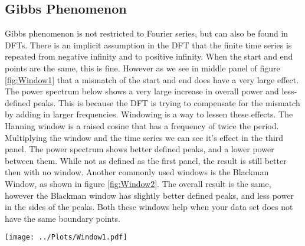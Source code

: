 \documentclass[twocolumn]{myarticle}
\begin{document}

\subsection{Gibbs Phenomenon}
\label{sec:gibbs_phenomenon}

Gibbs phenomenon is not restricted to Fourier series, but can also be found in DFTs. 
There is an implicit assumption in the DFT that the finite time series is repeated from negative infinity and to positive infinity. 
When the start and end points are the same, this is fine. 
However as we see in middle panel of figure \ref{fig:Window1} that a mismatch of the start and end does have a very large effect. 
The power spectrum below shows a very large increase in overall power and less-defined peaks. 
This is because the DFT is trying to compensate for the mismatch by adding in larger frequencies. 
Windowing is a way to lessen these effects. 
The Hanning window is a raised cosine that has a frequency of twice the period. 
Multiplying the window and the time series we can see it's effect in the third panel. 
The power spectrum shows better defined peaks, and a lower power between them. 
While not as defined as the first panel, the result is still better then with no window. 
Another commonly used windows is the Blackman Window, as shown in figure \ref{fig:Window2}. 
The overall result is the same, however the Blackman window has slightly better defined peaks, and less power in the sides of the peaks. 
Both these windows help when your data set does not have the same boundary points.

\begin{figure*}[htb]
    \centering
    \texttt{[image: ../Plots/Window1.pdf]}
    \caption{%
        Looking at the Hanning window. The top resents the time series of a plain sine wave, a sine wave that is not periodic in the interval, and the effect of the Hanning window on the non-periodic wave. The bottom displays the corresponding power spectra.
    }
    \label{fig:Window1}
\end{figure*}
\end{document}
